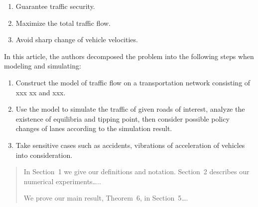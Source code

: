 \documentclass{icmmcm}
\begin{document}
\begin{enumerate}
\item Guarantee traffic security.
\item Maximize the total traffic flow.
\item Avoid sharp change of vehicle velocities.
\end{enumerate}
In this article, the authors decomposed the problem into the following steps when modeling and simulating:
\begin{enumerate}
\item Construct the model of traffic flow on a transportation network consisting of xxx xx and xxx.
\item Use the model to simulate the traffic of given roads of interest, analyze the existence of equilibria and tipping point, then consider possible policy changes of lanes according to the simulation result.
\item Take sensitive cases such as accidents, vibrations of acceleration of vehicles into consideration.
\end{enumerate}
\begin{quotation}
  In Section~1 we give our definitions and notation. Section~2
  describes our numerical experiments\ldots{}..

  We prove our main result, Theorem~6, in Section~5\ldots{}.
\end{quotation}
\end{document}
